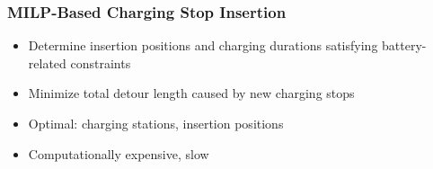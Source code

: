 \documentclass[aspectratio=1610]{beamer}
\begin{document}
\begin{frame}
  \frametitle{MILP-Based Charging Stop Insertion}
  
\begin{itemize}
	\item Determine insertion positions and charging durations satisfying battery-related constraints 
	\item Minimize total detour length caused by new charging stops %
\end{itemize} 

\bigskip

\begin{itemize}
	\item Optimal: charging stations, insertion positions
\end{itemize}

\bigskip

\begin{itemize}
	\item Computationally expensive, slow 
\end{itemize}

\end{frame}
\end{document}
